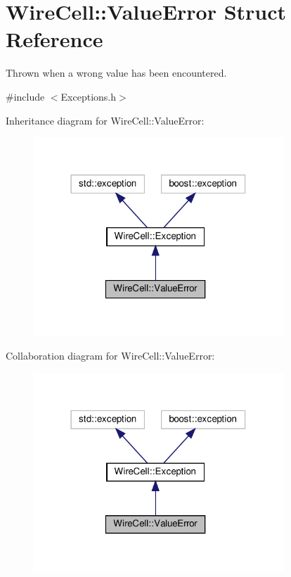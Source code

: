 \hypertarget{struct_wire_cell_1_1_value_error}{}\section{Wire\+Cell\+:\+:Value\+Error Struct Reference}
\label{struct_wire_cell_1_1_value_error}


Thrown when a wrong value has been encountered.  




{\ttfamily \#include $<$Exceptions.\+h$>$}



Inheritance diagram for Wire\+Cell\+:\+:Value\+Error\+:
\nopagebreak
\begin{figure}[H]
\begin{center}
\leavevmode
\includegraphics[width=266pt]{struct_wire_cell_1_1_value_error__inherit__graph}
\end{center}
\end{figure}


Collaboration diagram for Wire\+Cell\+:\+:Value\+Error\+:
\nopagebreak
\begin{figure}[H]
\begin{center}
\leavevmode
\includegraphics[width=266pt]{struct_wire_cell_1_1_value_error__coll__graph}
\end{center}
\end{figure}
